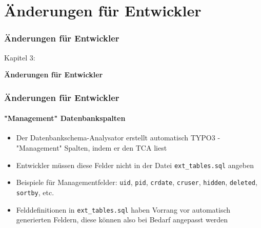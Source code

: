 %

\section{Änderungen für Entwickler}
\begin{frame}[fragile]
	\frametitle{Änderungen für Entwickler}

	\begin{center}\huge{Kapitel 3:}\end{center}
	\begin{center}\huge{\color{typo3darkgrey}\textbf{Änderungen für Entwickler}}\end{center}

\end{frame}


\begin{frame}[fragile]
	\frametitle{Änderungen für Entwickler}
	\framesubtitle{"Management" Datenbankspalten}

	\begin{itemize}
		\item Der Datenbankschema-Analysator erstellt automatisch TYPO3 - "Management"
			Spalten, indem er den TCA liest
		\item Entwickler müssen diese Felder nicht in der Datei 
			\texttt{ext\_tables.sql} angeben
		\item Beispiele für Managementfelder:\newline
			\texttt{uid}, \texttt{pid}, \texttt{crdate}, \texttt{cruser},
			\texttt{hidden}, \texttt{deleted}, \texttt{sortby}, etc.
		\item Felddefinitionen in \texttt{ext\_tables.sql} haben Vorrang vor automatisch 
			generierten Feldern, diese können also bei Bedarf
			angepasst werden
	\end{itemize}

\end{frame}

